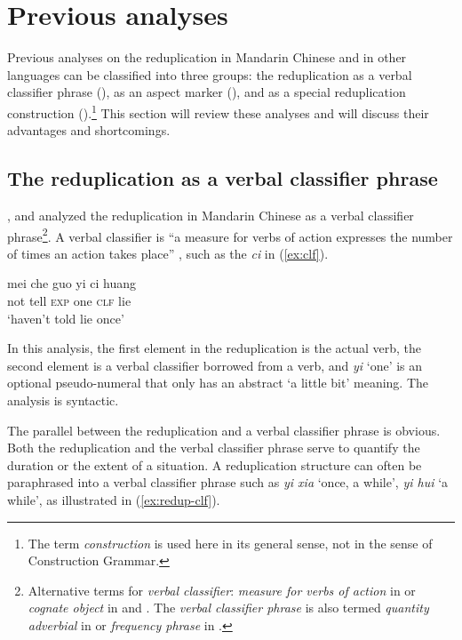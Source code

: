 \section{Previous analyses}\label{sec:prev}

Previous analyses on the reduplication in Mandarin Chinese and in other languages can be classified
into three groups:  the reduplication as a verbal classifier phrase (), as an aspect marker (), and
as a special reduplication construction ().\footnote{The term \textit{construction} is used here in its general sense, not in the sense of Construction Grammar.} 
This section will review these analyses and will discuss their advantages and shortcomings.



\subsection{The reduplication as a verbal classifier phrase}\label{sec:clf}

\citet{Fan1964}, \citet[205]{Chao1968} and \citet{Xiong2016} analyzed the reduplication in Mandarin Chinese
as a verbal classifier phrase\footnote{Alternative terms for \textit{verbal classifier}: \textit{measure for verbs of action} in \citet[615]{Chao1968} or \textit{cognate object} in \citet[312]{Chao1968} and  \citet[263]{Hong1999}.
The \textit{verbal classifier phrase}  is also termed \textit{quantity adverbial} in \citet[352--353]{LiThompson1981} or \textit{frequency phrase} in \citet[91]{Huangetal2009}.}.
A verbal classifier is ``a measure for verbs of action expresses the number of times an action takes place” \citep[615]{Chao1968}, such as the \textit{ci} in (\ref{ex:clf}). 

\ea\label{ex:clf}
\gll mei che guo yi ci huang\\
not tell \textsc{exp} one \textsc{clf} lie\\ \hfill {\citep[616]{Chao1968}}
\glt `haven't told lie once'
\z

In this analysis, the first element in the reduplication is the actual verb, 
the second element is a verbal classifier borrowed from a verb, 
and \textit{yi} `one' is an optional pseudo-numeral that only has an abstract `a little bit' meaning.
The analysis is syntactic.

The parallel between the reduplication and a verbal classifier phrase is obvious. 
Both the reduplication and the verbal classifier phrase serve to quantify the duration or the extent of a situation. 
A reduplication structure can often be paraphrased into a verbal classifier phrase such as \textit{yi xia} ‘once, a while’, \textit{yi hui} ‘a while’, as illustrated in (\ref{ex:redup-clf}).

